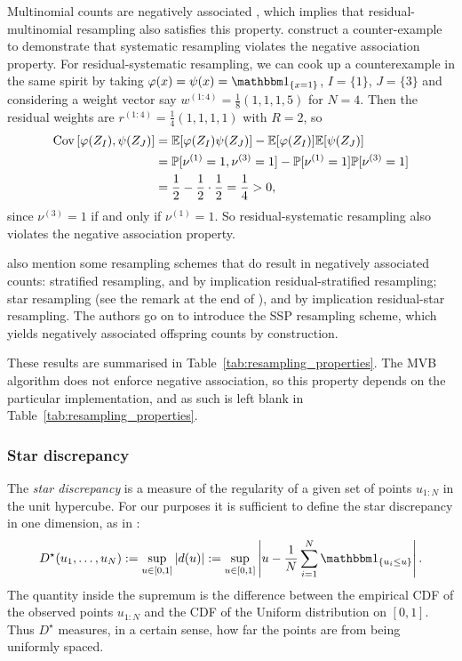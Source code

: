 Multinomial counts are negatively associated \parencite[Section 3.1]{joag1983}, which implies that residual-multinomial resampling also satisfies this property.
\textcite{gerber2017} construct a counter-example to demonstrate that systematic resampling violates the negative association property.
For residual-systematic resampling, we can cook up a counterexample in the same spirit by taking $\varphi(x)=\psi(x)=\I{x=1}$, $I=\{1\}$, $J=\{3\}$ and considering a weight vector say $w^{(1:4)} = \frac{1}{8}(1,1,1,5)$ for $N=4$. Then the residual weights are $r^{(1:4)} = \frac{1}{4}(1,1,1,1)$ with $R=2$, so
\begin{align*}
\operatorname{Cov} \left[ \varphi( Z_I) , \psi(Z_J) \right]
&= \mathbb{E}[ \varphi( Z_I) \psi(Z_J) ] - \mathbb{E}[\varphi( Z_I) ] \mathbb{E}[\psi(Z_J) ] \\
&=\mathbb{P}[\nu^{(1)}=1, \nu^{(3)}=1] - \mathbb{P}[\nu^{(1)}=1] \mathbb{P}[\nu^{(3)}=1] \\
&= \frac{1}{2} - \frac{1}{2} \cdot \frac{1}{2} 
= \frac{1}{4}
>0 ,
\end{align*}
since $\nu^{(3)}=1$ if and only if $\nu^{(1)}=1$. 
So residual-systematic resampling also violates the negative association property.

\textcite{gerber2017} also mention some resampling schemes that do result in negatively associated counts: stratified resampling, and by implication residual-stratified resampling; star resampling (see the remark at the end of \textcite[Section 3.2]{gerber2017}), and by implication residual-star resampling.
The authors go on to introduce the SSP resampling scheme, which yields negatively associated offspring counts by construction.

These results are summarised in Table~\ref{tab:resampling_properties}.
The MVB algorithm does not enforce negative association, so this property depends on the particular implementation, and as such is left blank in Table~\ref{tab:resampling_properties}.







\subsubsection{Star discrepancy}
The \emph{star discrepancy} is a measure of the regularity of a given set of points $u_{1:N}$ in the unit hypercube. For our purposes it is sufficient to define the star discrepancy in one dimension, as in \textcite[Definition 1.2]{kuipers1974}:
\begin{equation}\label{eq:defn_stardiscrepancy}
D^\star (u_1, \dots, u_N)
:= \sup_{u \in [0,1]} | d(u) |
:= \sup_{u \in [0,1]} \left| u - \frac{1}{N} \sum_{i=1}^N \I{u_i \leq u} \right| .
\end{equation}
The quantity inside the supremum is the difference between the empirical CDF of the observed points $u_{1:N}$ and the CDF of the Uniform distribution on $[0,1]$.
Thus $D^\star$ measures, in a certain sense, how far the points are from being uniformly spaced.

